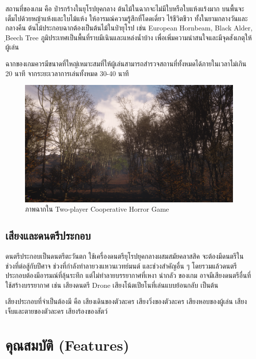 สถานที่ของเกม คือ ป่ารกร้างในยุโรปยุคกลาง ต้นไม้ในฉากจะไม่มีใบหรือใบแห้งแร้งมาก บนพื้นจะเต็มไปด้วยหญ้าแห้งและใบไม้แห้ง ให้อารมณ์ความรู้สึกที่โดดเดี่ยว ไร้ชีวิตชีวา ทั้งในยามกลางวันและกลางคืน ต้นไม้ประกอบฉากต้องเป็นต้นไม้ในป่ายุโรป เช่น European Hornbeam, Black Alder, ฺBeech Tree ภูมิประเทศเป็นพื้นที่ราบมีเนินและแหล่งน้ำบ้าง เพื่อเพิ่มความน่าสนใจและมีจุดสังเกตุให้ผู้เล่น

ฉากของเกมควรมีขนาดที่ใหญ่เหมาะสมที่ให้ผู้เล่นสามารถสำรวจสถานที่ทั้งหมดได้ภายในเวลาไม่เกิน 20 นาที จากระยะเวลาการเล่นทั้งหมด 30-40 นาที

\begin{figure}[h]
  \begin{center}
  \includegraphics[width=\textwidth]{./img/screenshots/dayshot2.png}
  \end{center}
  \caption[ภาพฉากใน Two-player Cooperative Horror Game]{ภาพฉากใน Two-player Cooperative Horror Game}
  \label{fig:gameshot}
\end{figure}
\subsection{เสียงและดนตรีประกอบ}

ดนตรีประกอบเป็นดนตรีตะวันตก ใช้เครื่องดนตรียุโรปยุคกลางผสมสมัยคลาสสิค จะต้องมีดนตรีในช่วงที่ต่อสู้กับปีศาจ ช่วงที่กำลังทำลายวงแหวนเวทย์มนต์ และช่วงสำคัญอื่น ๆ โดยรวมแล้วดนตรีประกอบต้องมีอารมณ์ที่ลุ้นระทึก แต่ไม่ทำลายบรรยากาศที่เหงา น่ากลัว ของเกม อาจมีเสียงดนตรีอื่นที่ใช้สร้างบรรยากาศ เช่น เสียงดนตรี Drone เสียงโน้ตเปียโนที่เล่นแบบย้อนกลับ เป็นต้น

เสียงประกอบที่จำเป็นต้องมี คือ เสียงเดินของตัวละคร เสียงวิ่งของตัวละคร เสียงหอบของผู้เล่น
เสียงเจ็บและตายของตัวละคร เสียงร้องของสัตว์

\section{คุณสมบัติ (Features)}

